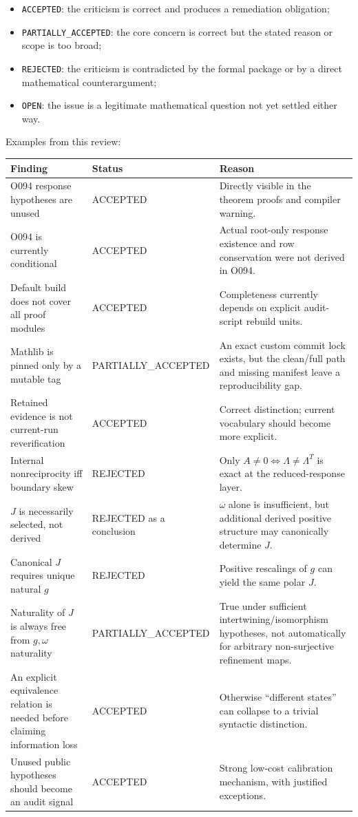 \documentclass[11pt,a4paper]{article}
\begin{document}
\begin{itemize}
  \item \texttt{ACCEPTED}: the criticism is correct and produces a remediation obligation;
  \item \texttt{PARTIALLY\_ACCEPTED}: the core concern is correct but the stated reason or scope is too broad;
  \item \texttt{REJECTED}: the criticism is contradicted by the formal package or by a direct mathematical counterargument;
  \item \texttt{OPEN}: the issue is a legitimate mathematical question not yet settled either way.
\end{itemize}

Examples from this review:

\begin{longtable}{@{}p{5.2cm}p{3.2cm}p{6.0cm}@{}}
\toprule
\textbf{Finding} & \textbf{Status} & \textbf{Reason} \\
\midrule
\endhead
O094 response hypotheses are unused & ACCEPTED & Directly visible in the theorem proofs and compiler warning. \\
O094 is currently conditional & ACCEPTED & Actual root-only response existence and row conservation were not derived in O094. \\
Default build does not cover all proof modules & ACCEPTED & Completeness currently depends on explicit audit-script rebuild units. \\
Mathlib is pinned only by a mutable tag & PARTIALLY\_ACCEPTED & An exact custom commit lock exists, but the clean/full path and missing manifest leave a reproducibility gap. \\
Retained evidence is not current-run reverification & ACCEPTED & Correct distinction; current vocabulary should become more explicit. \\
Internal nonreciprocity iff boundary skew & REJECTED & Only $A\neq0\iff\Lambda\neq\Lambda^{T}$ is exact at the reduced-response layer. \\
$J$ is necessarily selected, not derived & REJECTED as a conclusion & $\omega$ alone is insufficient, but additional derived positive structure may canonically determine $J$. \\
Canonical $J$ requires unique natural $g$ & REJECTED & Positive rescalings of $g$ can yield the same polar $J$. \\
Naturality of $J$ is always free from $g,\omega$ naturality & PARTIALLY\_ACCEPTED & True under sufficient intertwining/isomorphism hypotheses, not automatically for arbitrary non-surjective refinement maps. \\
An explicit equivalence relation is needed before claiming information loss & ACCEPTED & Otherwise ``different states'' can collapse to a trivial syntactic distinction. \\
Unused public hypotheses should become an audit signal & ACCEPTED & Strong low-cost calibration mechanism, with justified exceptions. \\
\bottomrule
\end{longtable}
\end{document}
